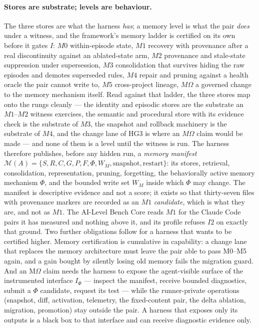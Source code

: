 \documentclass[11pt]{article}
\theoremstyle{definition}
\begin{document}
\paragraph{Stores are substrate; levels are behaviour.} The three stores are what the harness \emph{has}; a memory level is what the pair \emph{does} under a witness, and the framework's memory ladder is certified on its own before it gates $I$: $M0$ within-episode state, $M1$ recovery with provenance after a real discontinuity against an ablated-state arm, $M2$ provenance and stale-state suppression under supersession, $M3$ consolidation that survives hiding the raw episodes and demotes superseded rules, $M4$ repair and pruning against a health oracle the pair cannot write to, $M5$ cross-project lineage, $M\Omega$ a governed change to the memory mechanism itself. Read against that ladder, the three stores map onto the rungs cleanly --- the identity and episodic stores are the substrate an $M1$--$M2$ witness exercises, the semantic and procedural store with its evidence check is the substrate of $M3$, the snapshot and rollback machinery is the substrate of $M4$, and the change lane of HG3 is where an $M\Omega$ claim would be made --- and none of them is a level until the witness is run. The harness therefore publishes, before any hidden run, a \emph{memory manifest} $\mathcal M(A) = \{S, R, C, G, P, F, \Phi, W_M, \text{snapshot}, \text{restart}\}$: its stores, retrieval, consolidation, representation, pruning, forgetting, the behaviorally active memory mechanism $\Phi$, and the bounded write set $W_M$ inside which $\Phi$ may change. The manifest is descriptive evidence and not a score; it exists so that thirty-seven files with provenance markers are recorded as an $M1$ \emph{candidate}, which is what they are, and not as $M1$. The AI-Level Bench Core reads $M1$ for the Claude Code pairs it has measured and nothing above it, and its profile refuses $I2$ on exactly that ground. Two further obligations follow for a harness that wants to be certified higher. Memory certification is cumulative in capability: a change lane that replaces the memory architecture must leave the pair able to pass M0--M5 again, and a gain bought by silently losing old memory fails the migration guard. And an M$\Omega$ claim needs the harness to expose the agent-visible surface of the instrumented interface $I_\Phi$ --- inspect the manifest, receive bounded diagnostics, submit a $\Phi$ candidate, request its test --- while the runner-private operations (snapshot, diff, activation, telemetry, the fixed-content pair, the delta ablation, migration, promotion) stay outside the pair. A harness that exposes only its outputs is a black box to that interface and can receive diagnostic evidence only.
\end{document}
